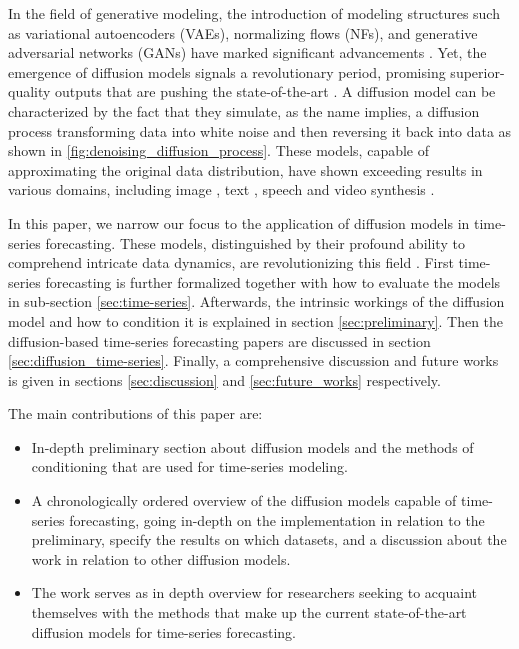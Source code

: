 In the field of generative modeling, the introduction of modeling structures such as variational autoencoders (VAEs), normalizing flows (NFs), and generative adversarial networks (GANs) have marked significant advancements \cite{foster_generative_2022, bond-taylor_deep_2022}. Yet, the emergence of diffusion models signals a revolutionary period, promising superior-quality outputs that are pushing the state-of-the-art \cite{dhariwal_diffusion_2021, yang_diffusion_2023, croitoru_diffusion_2023}. A diffusion model can be characterized by the fact that they simulate, as the name implies, a diffusion process transforming data into white noise and then reversing it back into data as shown in \autoref{fig:denoising_diffusion_process}.
These models, capable of approximating the original data distribution, have shown exceeding results in various domains, including image \cite{ho_cascaded_2021, dhariwal_diffusion_2021, rombach_high-resolution_2022, austin_structured_2021}, text \cite{gong_diffuseq_2023, li_diffusion-lm_2022, yu_latent_2023}, speech \cite{kong_diffwave_2020, yang_diffsound_2023} and video synthesis \cite{yang_diffusion_2022, harvey_flexible_2022, ho_imagen_2022, ho_video_2022}.

In this paper, we narrow our focus to the application of diffusion models in time-series forecasting. These models, distinguished by their profound ability to comprehend intricate data dynamics, are revolutionizing this field \cite{lin_diffusion_2023, koo_comprehensive_2023}. First time-series forecasting is further formalized together with how to evaluate the models in sub-section \ref{sec:time-series}. Afterwards, the intrinsic workings of the diffusion model and how to condition it is explained in section \ref{sec:preliminary}. Then the diffusion-based time-series forecasting papers are discussed in section \ref{sec:diffusion_time-series}. Finally, a comprehensive discussion and future works is given in sections \ref{sec:discussion} and \ref{sec:future_works} respectively.

The main contributions of this paper are:
\begin{itemize}
    \item In-depth preliminary section about diffusion models and the methods of conditioning that are used for time-series modeling.
    \item A chronologically ordered overview of the diffusion models capable of time-series forecasting, going in-depth on the implementation in relation to the preliminary, specify the results on which datasets, and a discussion about the work in relation to other diffusion models. 
    \item The work serves as in depth overview for researchers seeking to acquaint themselves with the methods that make up the current state-of-the-art diffusion models for time-series forecasting. 
\end{itemize}

